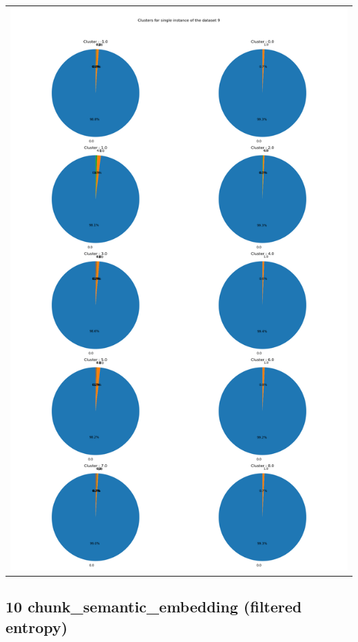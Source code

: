 \begin{longtable}{|c|c|c|c|c|}
\multicolumn{5}{|c|}{\includegraphics[width=0.8\linewidth]{img/annexes/9/clustering_pie_charts/single instance.png}} \\
\end{longtable}


\subsection{10 chunk\_semantic\_embedding (filtered entropy)}

